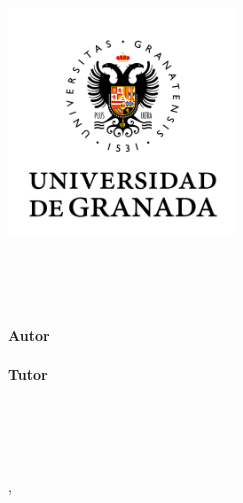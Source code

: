 \begin{titlepage}
    \begin{addmargin}[-3.45cm]{-3cm}
    \begin{center}
        \large  

        \hfill

        \includegraphics[width=6cm]{images/ugrmarca} \\ \medskip

        \vfill

        \begingroup
            \color{TealBlue}\spacedallcaps{\myTitle} \\ \bigskip
        \endgroup

        \spacedlowsmallcaps{\mySubtitle}

        \vfill

        \myWork \\ 
        \myDegree \\ \bigskip
        \textbf{Autor} \\
        \myName \\ \medskip
        \textbf{Tutor} \\
        \myProf \\ \bigskip
        \spacedlowsmallcaps{\myFaculty} \\ \medskip
        \spacedlowsmallcaps{\myOtherFacultyA} \\
        \spacedlowsmallcaps{\myOtherFacultyB} \\ \bigskip

        \myLocation, \myTime %

        \vfill                      

    \end{center}  
  \end{addmargin}       
\end{titlepage}   
